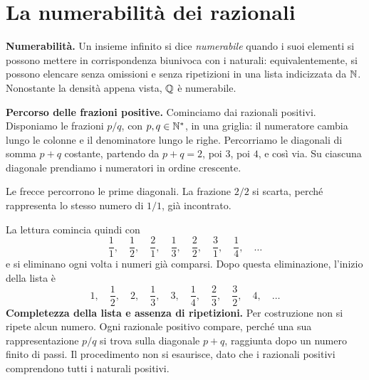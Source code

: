 \section{La numerabilità dei razionali}

\textbf{Numerabilità.} Un insieme infinito si dice \emph{numerabile} quando i suoi elementi si possono mettere in corrispondenza biunivoca con i naturali: equivalentemente, si possono elencare senza omissioni e senza ripetizioni in una lista indicizzata da $\mathbb{N}$. Nonostante la densità appena vista, $\mathbb{Q}$ è numerabile.

\textbf{Percorso delle frazioni positive.} Cominciamo dai razionali positivi. Disponiamo le frazioni $p/q$, con $p,q\in\mathbb{N}^*$, in una griglia: il numeratore cambia lungo le colonne e il denominatore lungo le righe. Percorriamo le diagonali di somma $p+q$ costante, partendo da $p+q=2$, poi $3$, poi $4$, e così via. Su ciascuna diagonale prendiamo i numeratori in ordine crescente.

\begin{schema}
\par\smallskip Le frecce percorrono le prime diagonali. La frazione $2/2$ si scarta, perché rappresenta lo stesso numero di $1/1$, già incontrato.
\end{schema}

La lettura comincia quindi con
\[
  \frac11,\quad\frac12,\quad\frac21,\quad\frac13,\quad
  \frac22,\quad\frac31,\quad\frac14,\quad\ldots
\]
e si eliminano ogni volta i numeri già comparsi. Dopo questa eliminazione, l'inizio della lista è
\[
  1,\quad\frac12,\quad2,\quad\frac13,\quad3,\quad
  \frac14,\quad\frac23,\quad\frac32,\quad4,\quad\ldots
\]
\textbf{Completezza della lista e assenza di ripetizioni.} Per costruzione non si ripete alcun numero. Ogni razionale positivo compare, perché una sua rappresentazione $p/q$ si trova sulla diagonale $p+q$, raggiunta dopo un numero finito di passi. Il procedimento non si esaurisce, dato che i razionali positivi comprendono tutti i naturali positivi.

